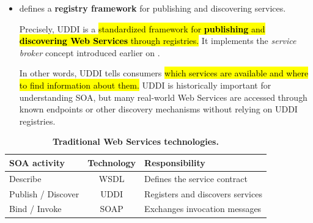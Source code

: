 \begin{itemize}
    \item {} defines a \textbf{registry framework} for publishing and discovering services.

        Precisely, UDDI is a \hl{standardized framework for \textbf{publishing} and \textbf{discovering Web Services} through registries.} It implements the \emph{service broker} concept introduced earlier on .

        In other words, UDDI tells consumers \hl{which services are available and where to find information about them.} UDDI is historically important for understanding SOA, but many real-world Web Services are accessed through known endpoints or other discovery mechanisms without relying on UDDI registries.
\end{itemize}

\highspace
\begin{table}[!htp]
    \centering
    \begin{tabular}{@{} l c l @{}}
        \toprule
        \textbf{SOA activity} & \textbf{Technology} & \textbf{Responsibility} \\
        \midrule
        Describe & WSDL & Defines the service contract \\[.5em]
        Publish / Discover & UDDI & Registers and discovers services \\[.5em]
        Bind / Invoke & SOAP & Exchanges invocation messages \\
        \bottomrule
    \end{tabular}
    \caption{\textbf{Traditional Web Services technologies.}}
\end{table}

